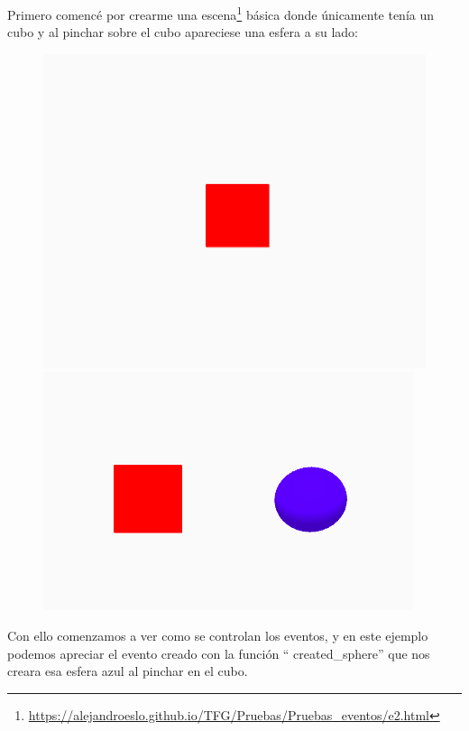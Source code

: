 \documentclass[a4paper, 12pt]{book}
\begin{document}
\newpage
Primero comencé por crearme una escena\footnote{\url{https://alejandroeslo.github.io/TFG/Pruebas/Pruebas_eventos/e2.html}} básica donde únicamente tenía un cubo y al pinchar sobre el cubo apareciese una esfera a su lado:

\begin{figure}[h]
\centering
    \includegraphics[scale=0.35]{img/escena1_1a.png}
    \includegraphics[scale=0.45]{img/escena1_1b.png}
\end{figure}

Con ello comenzamos a ver como se controlan los eventos, y en este ejemplo podemos apreciar el evento creado con la función “ created\_sphere” que nos creara esa esfera azul al pinchar en el cubo.
\end{document}
